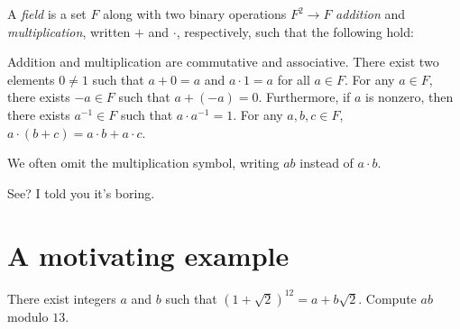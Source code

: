\documentclass[11pt]{scrartcl}
\begin{document}
\begin{definition}
    A \emph{field} is a set $F$ along with two binary operations $F^2 \to F$ \emph{addition} and \emph{multiplication}, written $+$ and $\cdot$, respectively, such that the following hold:
    \begin{itemize}
        \ii Addition and multiplication are commutative and associative.
        \ii There exist two elements $0 \neq 1$ such that $a + 0 = a$ and $a \cdot 1 = a$ for all $a \in F$.
        \ii For any $a \in F$, there exists $-a \in F$ such that $a + (-a) = 0$. Furthermore, if $a$ is nonzero, then there exists $a^{-1} \in F$ such that $a \cdot a^{-1} = 1$.
        \ii For any $a,b,c \in F$, $a \cdot (b + c) = a \cdot b + a \cdot c$.
    \end{itemize}
    We often omit the multiplication symbol, writing $ab$ instead of $a \cdot b$.
\end{definition}

See? I told you it's boring.

\section{A motivating example}

\begin{example}\label{exa:motivation}
	There exist integers $a$ and $b$ such that $(1 + \sqrt 2)^{12} = a + b\sqrt2$. Compute $ab$ modulo $13$.
\end{example}
\end{document}
